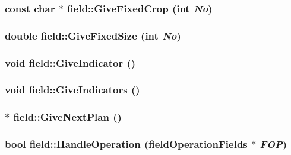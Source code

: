 \label{classfield_a83310dd2f0b81ec3178627f285e7535a}
\hypertarget{classfield_aa6414fb1ce4976eb0b4693572c545352}{
\subsubsection[{GiveFixedCrop}]{\setlength{\rightskip}{0pt plus 5cm}const char $\ast$ field::GiveFixedCrop (int {\em No})}}
\label{classfield_aa6414fb1ce4976eb0b4693572c545352}
\hypertarget{classfield_ad7e63b07d4199618d6e0cdfd16619b95}{
\subsubsection[{GiveFixedSize}]{\setlength{\rightskip}{0pt plus 5cm}double field::GiveFixedSize (int {\em No})}}
\label{classfield_ad7e63b07d4199618d6e0cdfd16619b95}
\hypertarget{classfield_a1ea940c20a6d0f4edadaf9f2d3ebc8c1}{
\subsubsection[{GiveIndicator}]{\setlength{\rightskip}{0pt plus 5cm}void field::GiveIndicator ()}}
\label{classfield_a1ea940c20a6d0f4edadaf9f2d3ebc8c1}
\hypertarget{classfield_a5e7c7c8374cf01bc46d7e0c4619b5bd5}{
\subsubsection[{GiveIndicators}]{\setlength{\rightskip}{0pt plus 5cm}void field::GiveIndicators ()}}
\label{classfield_a5e7c7c8374cf01bc46d7e0c4619b5bd5}
\hypertarget{classfield_a25fdbd15094af59bac804070622daf40}{
\subsubsection[{GiveNextPlan}]{$\ast$ field::GiveNextPlan ()}}
\label{classfield_a25fdbd15094af59bac804070622daf40}
\hypertarget{classfield_a0609f721e5761c23529f1f08f785a264}{
\subsubsection[{HandleOperation}]{\setlength{\rightskip}{0pt plus 5cm}bool field::HandleOperation ({\bf fieldOperationFields} $\ast$ {\em FOP})}}
